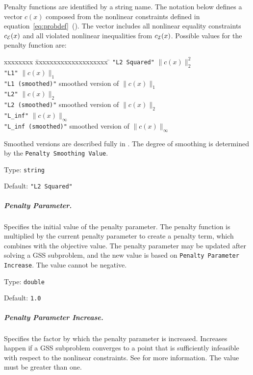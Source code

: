 \noindent
Penalty functions are identified by a string name.
The notation below defines a vector $c(x)$ composed
from the nonlinear constraints defined in
equation~\ref{eq:probdef}~().
The vector includes all nonlinear equality constraints $c_{\cal E}(x)$
and all violated nonlinear inequalities from $c_{\cal I}(x)$.
Possible values for the penalty function are:
\begin{tabbing}
  xxxxxxxx \= xxxxxxxxxxxxxxxxxxxx \= \kill
     \> {\tt "L2 Squared"}        \> $\| c(x) \|_2^2$  \\
     \> {\tt "L1"}                \> $\| c(x) \|_1$  \\
     \> {\tt "L1 (smoothed)"}     \> smoothed version of $\| c(x) \|_1$  \\
     \> {\tt "L2"}                \> $\| c(x) \|_2$  \\
     \> {\tt "L2 (smoothed)"}     \> smoothed version of $\| c(x) \|_2$  \\
     \> {\tt "L\_inf"}            \> $\| c(x) \|_\infty$  \\
     \> {\tt "L\_inf (smoothed)"} \> smoothed version of $\| c(x) \|_\infty$
\end{tabbing}
Smoothed versions are described fully in \cite{GSS-GrKoSAND07}.
The degree of smoothing is determined by the {\tt Penalty Smoothing Value}.

\hspace{0.2in}
Type: {\tt string}

\hspace{0.2in}
Default: {\tt "L2 Squared"}

\subparagraph{Penalty Parameter.}  \label{param:GSN-penparam}
Specifies the initial value of the penalty parameter.  The penalty
function is multiplied by the current penalty parameter to create a penalty term,
which combines with the objective value.
The penalty parameter may be updated after solving a GSS subproblem, and
the new value is based on {\tt Penalty Parameter Increase}.
The value cannot be negative.

\hspace{0.2in}
Type: {\tt double}

\hspace{0.2in}
Default: {\tt 1.0}

\subparagraph{Penalty Parameter Increase.}  \label{param:GSN-penincrease}
Specifies the factor by which the penalty parameter is increased.  Increases
happen if a GSS subproblem converges to a point that is sufficiently
infeasible with respect to the nonlinear constraints.
See \cite{GSS-GrKoSAND07} for more information.
The value must be greater than one.

